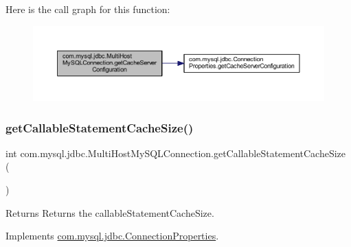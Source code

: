 Here is the call graph for this function\+:
\nopagebreak
\begin{figure}[H]
\begin{center}
\leavevmode
\includegraphics[width=350pt]{classcom_1_1mysql_1_1jdbc_1_1_multi_host_my_s_q_l_connection_aef3695ab6a8b5b8c534fc4020f6d12a4_cgraph}
\end{center}
\end{figure}
\mbox{\label{classcom_1_1mysql_1_1jdbc_1_1_multi_host_my_s_q_l_connection_ab0db994f2918b0c2f97e79fc57ca60a4}} 
\subsubsection{\texorpdfstring{get\+Callable\+Statement\+Cache\+Size()}{getCallableStatementCacheSize()}}
{\footnotesize\ttfamily int com.\+mysql.\+jdbc.\+Multi\+Host\+My\+S\+Q\+L\+Connection.\+get\+Callable\+Statement\+Cache\+Size (\begin{DoxyParamCaption}{ }\end{DoxyParamCaption})}

\begin{DoxyReturn}{Returns}
Returns the callable\+Statement\+Cache\+Size. 
\end{DoxyReturn}


Implements \mbox{\hyperlink{interfacecom_1_1mysql_1_1jdbc_1_1_connection_properties_a413ae8156c79a09e68023792a88351ac}{com.\+mysql.\+jdbc.\+Connection\+Properties}}.

